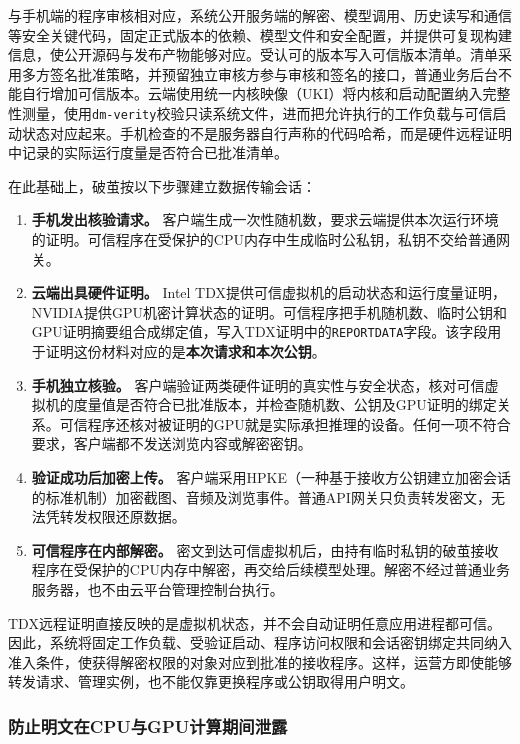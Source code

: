 与手机端的程序审核相对应，系统公开服务端的解密、模型调用、历史读写和通信等安全关键代码，固定正式版本的依赖、模型文件和安全配置，并提供可复现构建信息，使公开源码与发布产物能够对应。受认可的版本写入可信版本清单。清单采用多方签名批准策略，并预留独立审核方参与审核和签名的接口，普通业务后台不能自行增加可信版本。云端使用统一内核映像（UKI）将内核和启动配置纳入完整性测量，使用\texttt{dm-verity}校验只读系统文件，进而把允许执行的工作负载与可信启动状态对应起来。手机检查的不是服务器自行声称的代码哈希，而是硬件远程证明中记录的实际运行度量是否符合已批准清单。

在此基础上，破茧按以下步骤建立数据传输会话：

\begin{enumerate}
\def\labelenumi{\arabic{enumi}.}
\setlength{\itemsep}{0pt}\setlength{\parskip}{0pt}
\item
  \textbf{手机发出核验请求。} 客户端生成一次性随机数，要求云端提供本次运行环境的证明。可信程序在受保护的CPU内存中生成临时公私钥，私钥不交给普通网关。
\item
  \textbf{云端出具硬件证明。} Intel TDX提供可信虚拟机的启动状态和运行度量证明，NVIDIA提供GPU机密计算状态的证明。可信程序把手机随机数、临时公钥和GPU证明摘要组合成绑定值，写入TDX证明中的\texttt{REPORTDATA}字段。该字段用于证明这份材料对应的是\textbf{本次请求和本次公钥}。
\item
  \textbf{手机独立核验。} 客户端验证两类硬件证明的真实性与安全状态，核对可信虚拟机的度量值是否符合已批准版本，并检查随机数、公钥及GPU证明的绑定关系。可信程序还核对被证明的GPU就是实际承担推理的设备。任何一项不符合要求，客户端都不发送浏览内容或解密密钥。
\item
  \textbf{验证成功后加密上传。} 客户端采用HPKE（一种基于接收方公钥建立加密会话的标准机制）加密截图、音频及浏览事件。普通API网关只负责转发密文，无法凭转发权限还原数据。
\item
  \textbf{可信程序在内部解密。} 密文到达可信虚拟机后，由持有临时私钥的破茧接收程序在受保护的CPU内存中解密，再交给后续模型处理。解密不经过普通业务服务器，也不由云平台管理控制台执行。
\end{enumerate}

TDX远程证明直接反映的是虚拟机状态，并不会自动证明任意应用进程都可信。因此，系统将固定工作负载、受验证启动、程序访问权限和会话密钥绑定共同纳入准入条件，使获得解密权限的对象对应到批准的接收程序。这样，运营方即使能够转发请求、管理实例，也不能仅靠更换程序或公钥取得用户明文。

\subsubsection{防止明文在CPU与GPU计算期间泄露}\label{section:2.4.4}

